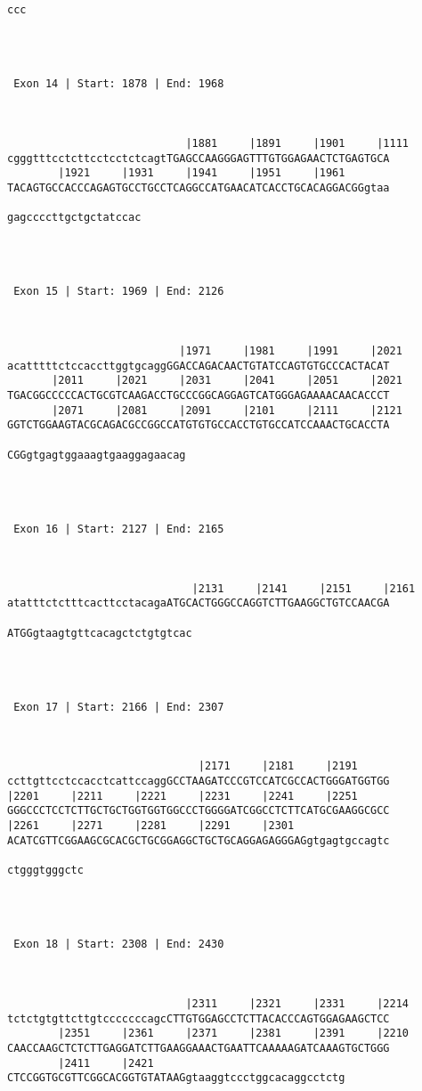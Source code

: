 \documentclass{article}
\begin{document}
\begin{Verbatim}
ccc




 Exon 14 | Start: 1878 | End: 1968 



                            |1881     |1891     |1901     |1111
cgggtttcctcttcctcctctcagtTGAGCCAAGGGAGTTTGTGGAGAACTCTGAGTGCA
        |1921     |1931     |1941     |1951     |1961       
TACAGTGCCACCCAGAGTGCCTGCCTCAGGCCATGAACATCACCTGCACAGGACGGgtaa
                     
gagccccttgctgctatccac




 Exon 15 | Start: 1969 | End: 2126 



                           |1971     |1981     |1991     |2021
acatttttctccaccttggtgcaggGGACCAGACAACTGTATCCAGTGTGCCCACTACAT
       |2011     |2021     |2031     |2041     |2051     |2021
TGACGGCCCCCACTGCGTCAAGACCTGCCCGGCAGGAGTCATGGGAGAAAACAACACCCT
       |2071     |2081     |2091     |2101     |2111     |2121
GGTCTGGAAGTACGCAGACGCCGGCCATGTGTGCCACCTGTGCCATCCAAACTGCACCTA
                            
CGGgtgagtggaaagtgaaggagaacag




 Exon 16 | Start: 2127 | End: 2165 



                             |2131     |2141     |2151     |2161
atatttctctttcacttcctacagaATGCACTGGGCCAGGTCTTGAAGGCTGTCCAACGA
                             
ATGGgtaagtgttcacagctctgtgtcac




 Exon 17 | Start: 2166 | End: 2307 



                              |2171     |2181     |2191     
ccttgttcctccacctcattccaggGCCTAAGATCCCGTCCATCGCCACTGGGATGGTGG
|2201     |2211     |2221     |2231     |2241     |2251     
GGGCCCTCCTCTTGCTGCTGGTGGTGGCCCTGGGGATCGGCCTCTTCATGCGAAGGCGCC
|2261     |2271     |2281     |2291     |2301               
ACATCGTTCGGAAGCGCACGCTGCGGAGGCTGCTGCAGGAGAGGGAGgtgagtgccagtc
            
ctgggtgggctc




 Exon 18 | Start: 2308 | End: 2430 



                            |2311     |2321     |2331     |2214
tctctgtgttcttgtcccccccagcCTTGTGGAGCCTCTTACACCCAGTGGAGAAGCTCC
        |2351     |2361     |2371     |2381     |2391     |2210
CAACCAAGCTCTCTTGAGGATCTTGAAGGAAACTGAATTCAAAAAGATCAAAGTGCTGGG
        |2411     |2421                              
CTCCGGTGCGTTCGGCACGGTGTATAAGgtaaggtccctggcacaggcctctg





\end{Verbatim}
\end{document}
